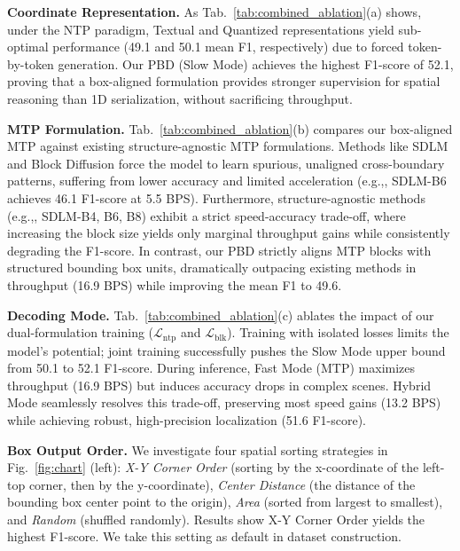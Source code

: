 \documentclass{llmxive}
\providecommand{\eg}{e.g.,\xspace}
\begin{document}
\noindent\textbf{Coordinate Representation.} As Tab.~\ref{tab:combined_ablation}(a) shows, under the NTP paradigm, Textual and Quantized representations yield sub-optimal performance (49.1 and 50.1 mean F1, respectively) due to forced token-by-token generation. Our PBD (Slow Mode) achieves the highest F1-score of 52.1, proving that a box-aligned formulation provides stronger supervision for spatial reasoning than 1D serialization, without sacrificing throughput.

\noindent\textbf{MTP Formulation.} Tab.~\ref{tab:combined_ablation}(b) compares our box-aligned MTP against existing structure-agnostic MTP formulations. Methods like SDLM and Block Diffusion force the model to learn spurious, unaligned cross-boundary patterns, suffering from lower accuracy and limited acceleration (\eg, SDLM-B6 achieves 46.1 F1-score at 5.5 BPS). Furthermore, structure-agnostic methods (\eg, SDLM-B4, B6, B8) exhibit a strict speed-accuracy trade-off, where increasing the block size yields only marginal throughput gains while consistently degrading the F1-score. In contrast, our PBD strictly aligns MTP blocks with structured bounding box units, dramatically outpacing existing methods in throughput (16.9 BPS) while improving the mean F1 to 49.6.

\noindent\textbf{Decoding Mode.} Tab.~\ref{tab:combined_ablation}(c) ablates the impact of our dual-formulation training ($\mathcal{L}_{\mathrm{ntp}}$ and $\mathcal{L}_{\mathrm{blk}}$). Training with isolated losses limits the model's potential; joint training successfully pushes the Slow Mode upper bound from 50.1 to 52.1 F1-score. During inference, Fast Mode (MTP) maximizes throughput (16.9 BPS) but induces accuracy drops in complex scenes. Hybrid Mode seamlessly resolves this trade-off, preserving most speed gains (13.2 BPS) while achieving robust, high-precision localization (51.6 F1-score).



\noindent\textbf{Box Output Order.} We investigate four spatial sorting strategies in Fig.~\ref{fig:chart} (left): \textit{X-Y Corner Order} (sorting by the x-coordinate of the left-top corner, then by the y-coordinate), \textit{Center Distance} (the distance of the bounding box center point to the origin), \textit{Area} (sorted from largest to smallest), and \textit{Random} (shuffled randomly). Results show X-Y Corner Order yields the highest F1-score. We take this setting as  default in dataset construction.
\end{document}
